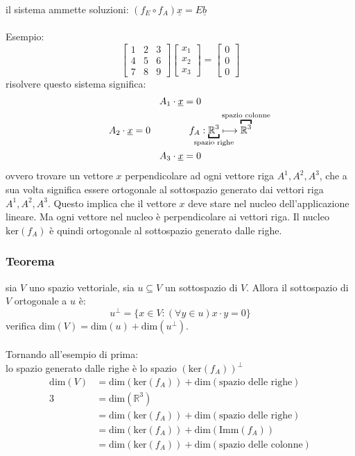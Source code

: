 \documentclass[italian]{article}
\newcommand{\ins}[1]{\text{$\mathbb{#1}$}}
\renewcommand{\dim}[1]{\text{dim$\left(#1\right)$}}
\renewcommand{\ker}[1]{\text{ker$\left(#1\right)$}}
\newcommand{\imm}[1]{\text{Imm$\left(#1\right)$}}
\begin{document}
il sistema ammette soluzioni: $(f_E \circ f_A)\underline{x} = E\underline{b}$\\\\

\newpage
\noindent
Esempio:
\[
	\begin{bmatrix}
		1 & 2 & 3 \\ 4 & 5 & 6 \\ 7 & 8 & 9
	\end{bmatrix}
	\begin{bmatrix}
		x_1 \\ x_2 \\ x_3
	\end{bmatrix}
	=
	\begin{bmatrix}
		0 \\ 0 \\ 0
	\end{bmatrix}
\]
risolvere questo sistema significa:
\begin{gather*}
	A_1 \cdot \underline{x} = 0 \\
	A_2 \cdot \underline{x} = 0 \qquad\qquad f_A: \underbracket{\ins{R}^3}_{\mathclap{\text{spazio righe}}} \longmapsto \overbracket{\ins{R}^3}^{\mathclap{\text{spazio colonne}}} \\
	A_3 \cdot \underline{x} = 0
\end{gather*}
ovvero trovare un vettore $x$ perpendicolare ad ogni vettore riga $A^1,A^2,A^3$, che a sua volta significa essere ortogonale al sottospazio generato dai vettori riga $A^1,A^2,A^3$. Questo implica che il vettore $x$ deve stare nel nucleo dell'applicazione lineare. Ma ogni vettore nel nucleo è perpendicolare ai vettori riga. Il nucleo $\ker{f_A}$ è quindi ortogonale al sottospazio generato dalle righe.

\subsubsection{Teorema}
sia $V$ uno spazio vettoriale, sia $u \subseteq V$ un sottospazio di $V$. Allora il sottospazio di $V$ ortogonale a $u$ è:
\[
	u^{\perp} = \{ x \in V : (\forall y \in u) x\cdot y = 0 \}
\]
verifica $\dim{V} = \dim{u} + \dim{u^{\perp}}$.\\\\

\noindent
Tornando all'esempio di prima:\\
lo spazio generato dalle righe è lo spazio $(\ker{f_A})^{\perp}$
\[
	\begin{split}
		\dim{V} &= \dim{\ker{f_A}} + \dim{\text{spazio delle righe}} \\	
		3 &= \dim{\ins{R}^3} \\
		&= \dim{\ker{f_A}} + \dim{\text{spazio delle righe}} \\
		&= \dim{\ker{f_A}} + \dim{\imm{f_A}} \\
		&= \dim{\ker{f_A}} + \dim{\text{spazio delle colonne}} 
	\end{split}
\]
\end{document}
